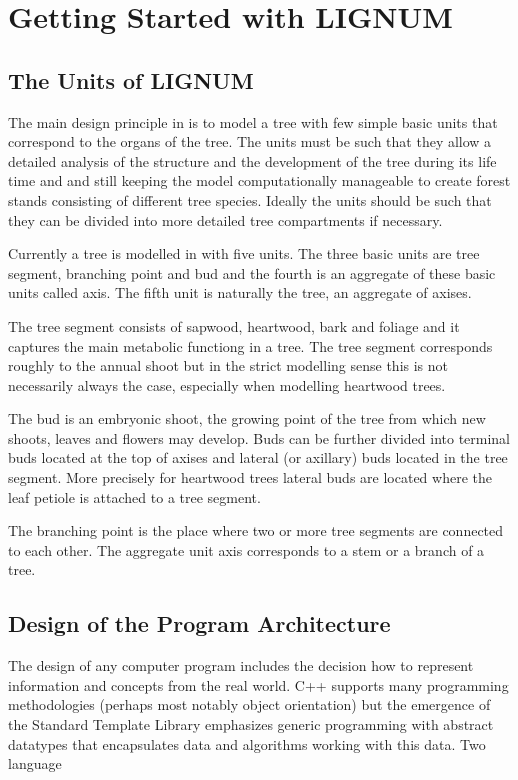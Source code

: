 \section{Getting Started with LIGNUM}

\subsection{The Units of LIGNUM} 

The  main design  principle in  \lignum is  to model  a tree  with few
simple  basic units that  correspond to  the organs  of the  tree. The
units  must  be  such that  they  allow  a  detailed analysis  of  the
structure and the development of the tree during its life time and and
still keeping  the model  computationally manageable to  create forest
stands consisting of different  tree species. Ideally the units should
be such that they can  be divided into more detailed tree compartments
if necessary.

Currently a  tree is modelled in  \lignum with five  units.  The three
basic units are  tree segment, branching point and  bud and the fourth
is an  aggregate of these basic  units called axis. The  fifth unit is
naturally the tree, an aggregate of axises.

The tree segment consists of  sapwood, heartwood, bark and foliage and
it captures the main metabolic  functiong in a tree.  The tree segment
corresponds roughly  to the annual  shoot but in the  strict modelling
sense  this  is  not  necessarily  always the  case,  especially  when
modelling heartwood trees.  

The bud  is  an embryonic shoot, the  growing  point of  the tree from
which new shoots, leaves and flowers may develop.  Buds can be further
divided into  terminal buds located at the  top of axises  and lateral
(or axillary) buds  located in the  tree segment.  More  precisely for
heartwood trees  lateral buds  are located where  the leaf  petiole is
attached to a tree segment.

The branching point is the place  where two or  more tree segments are
connected  to  each other.  The  aggregate unit  axis corresponds to a
stem or a branch of a tree.

\subsection{Design of the Program Architecture}

The  design of  any  computer  program includes  the  decision how  to
represent information  and concepts from the real  world. C++ supports
many   programming   methodologies   (perhaps  most   notably   object
orientation)  but  the  emergence  of the  Standard  Template  Library
emphasizes   generic   programming   with  abstract   datatypes   that
encapsulates data and algorithms  working with this data. Two language

